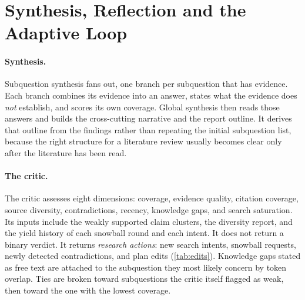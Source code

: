 \documentclass{article}
\begin{document}
\section{Synthesis, Reflection and the Adaptive Loop}
\label{sec:critic}

\paragraph{Synthesis.} Subquestion synthesis fans out, one branch per
subquestion that has evidence. Each branch combines its evidence into an
answer, states what the evidence does \emph{not} establish, and scores its
own coverage. Global synthesis then reads those answers and builds the
cross-cutting narrative and the report outline. It derives that outline
from the findings rather than repeating the initial subquestion list,
because the right structure for a literature review usually becomes clear
only after the literature has been read.

\paragraph{The critic.} The critic assesses eight dimensions: coverage,
evidence quality, citation coverage, source diversity, contradictions,
recency, knowledge gaps, and search saturation. Its inputs include the
weakly supported claim clusters, the diversity report, and the yield
history of each snowball round and each intent. It does not return a
binary verdict. It returns \emph{research actions}: new search intents,
snowball requests, newly detected contradictions, and plan edits
(\cref{tab:edits}). Knowledge gaps stated as free text are attached to the
subquestion they most likely concern by token overlap. Ties are broken
toward subquestions the critic itself flagged as weak, then toward the one
with the lowest coverage.
\end{document}

